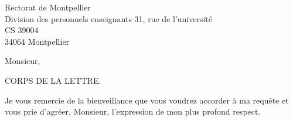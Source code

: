 \documentclass[11pt,%
twoside,%
leqno,%
fleqn,%
francais,%
origdate]{lettre}
\begin{document}
\begin{letter}{Rectorat de Montpellier\\
    Division des personnels enseignants
    31, rue de l'université\\
    CS 39004\\
    34064 Montpellier
  }
  \opening{Monsieur,}
  CORPS DE LA LETTRE.
  \closing{Je vous remercie de la bienveillance que vous voudrez accorder à ma requête et vous prie
    d'agréer, Monsieur, l'expression de mon plus profond respect.}
\end{letter}
%
\end{document}
